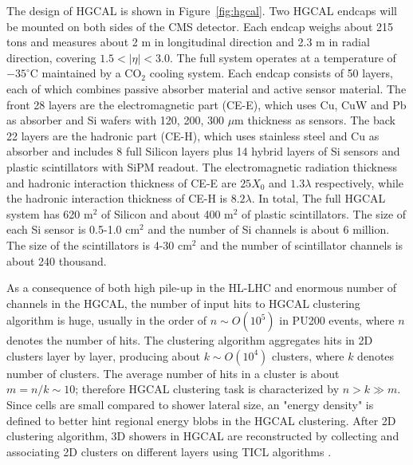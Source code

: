 The design of HGCAL \cite{Collaboration:2293646} is shown in Figure~\ref{fig:hgcal}. Two HGCAL endcaps will be mounted on both sides of the CMS detector. Each endcap weighs about 215 tons and measures about 2 m in longitudinal direction and 2.3 m in radial direction, covering $1.5<|\eta|<3.0$. The full system operates at a temperature of $-35^\circ$C maintained by a CO$_2$ cooling system. Each endcap consists of 50 layers, each of which combines passive absorber material and active sensor material. The front 28 layers are the electromagnetic part (CE-E), which uses Cu, CuW and Pb as absorber and Si wafers with 120, 200, 300 $\mu$m thickness as sensors. The back 22 layers are the hadronic part (CE-H), which uses stainless steel and Cu as absorber and includes 8 full Silicon layers plus 14 hybrid layers of Si sensors and plastic scintillators with SiPM readout. The electromagnetic radiation thickness and hadronic interaction thickness of CE-E are $25 X_0$ and $1.3 \lambda$ respectively, while the hadronic interaction thickness of CE-H is $8.2 \lambda$. In total, The full HGCAL system has 620 m$^2$ of Silicon and about 400 m$^2$ of plastic scintillators. The size of each Si sensor is 0.5-1.0 cm$^2$ and the number of Si channels is about 6 million. The size of the scintillators is 4-30 cm$^2$ and the number of scintillator channels is about 240 thousand.

As a consequence of both high pile-up in the HL-LHC and enormous number of channels in the HGCAL, the number of input hits to HGCAL clustering algorithm is huge, usually in the order of $n\sim O(10^5)$
in PU200 events, where $n$ denotes the number of hits. The clustering algorithm aggregates hits in 2D clusters layer by layer, producing about $k \sim O(10^4)$ clusters, where $k$ denotes number of clusters. The average number of hits in a cluster is about $m=n/k \sim 10$; therefore HGCAL clustering task is characterized by $n> k \gg m$. Since cells are small compared to shower lateral size, an "energy density" is defined to better hint regional energy blobs in the HGCAL clustering. After 2D clustering algorithm, 3D showers in HGCAL are reconstructed by collecting and associating 2D clusters on different layers using TICL algorithms \cite{ticlwebsite}.

